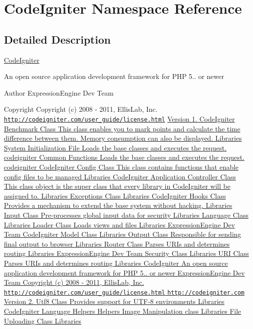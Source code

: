 \hypertarget{namespace_code_igniter}{}\section{Code\+Igniter Namespace Reference}
\label{namespace_code_igniter}


\subsection{Detailed Description}
\hyperlink{namespace_code_igniter}{Code\+Igniter}

An open source application development framework for P\+HP 5.. or newer

\begin{DoxyAuthor}{Author}
Expression\+Engine Dev Team 
\end{DoxyAuthor}
\begin{DoxyCopyright}{Copyright}
Copyright (c) 2008 -\/ 2011, Ellis\+Lab, Inc.  \href{http://codeigniter.com/user_guide/license.html}{\tt http\+://codeigniter.\+com/user\+\_\+guide/license.\+html} \hyperlink{}{Version 1.  Code\+Igniter Benchmark Class This class enables you to mark points and calculate the time difference between them. Memory consumption can also be displayed.  Libraries System Initialization File Loads the base classes and executes the request.  codeigniter Common Functions Loads the base classes and executes the request.  codeigniter Code\+Igniter Config Class This class contains functions that enable config files to be managed  Libraries Code\+Igniter Application Controller Class This class object is the super class that every library in Code\+Igniter will be assigned to.  Libraries Exceptions Class  Libraries Code\+Igniter Hooks Class Provides a mechanism to extend the base system without hacking.  Libraries Input Class Pre-\/processes global input data for security  Libraries Language Class  Libraries Loader Class Loads views and files  Libraries  Expression\+Engine Dev Team Code\+Igniter Model Class  Libraries Output Class Responsible for sending final output to browser  Libraries Router Class Parses U\+R\+Is and determines routing  Libraries  Expression\+Engine Dev Team Security Class  Libraries U\+RI Class Parses U\+R\+Is and determines routing  Libraries Code\+Igniter An open source application development framework for P\+HP 5.. or newer  Expression\+Engine Dev Team  Copyright (c) 2008 -\/ 2011, Ellis\+Lab, Inc.  \href{http://codeigniter.com/user_guide/license.html}{\tt http\+://codeigniter.\+com/user\+\_\+guide/license.\+html}  \href{http://codeigniter.com}{\tt http\+://codeigniter.\+com}  Version 2.  Utf8 Class Provides support for U\+T\+F-\/8 environments  Libraries Code\+Igniter Language Helpers  Helpers Image Manipulation class  Libraries File Uploading Class  Libraries }
\end{DoxyCopyright}
